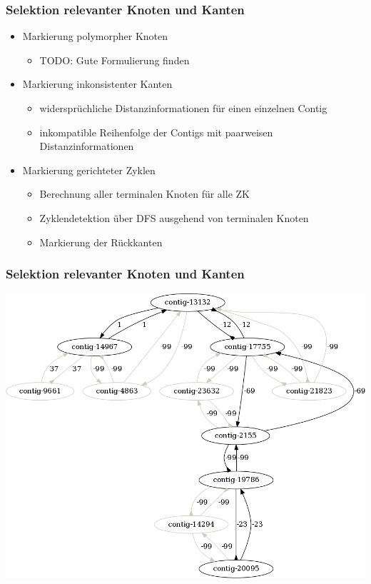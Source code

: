 \documentclass[xcolor=pst]{beamer}
\begin{document}
\begin{frame}
  \frametitle{Selektion relevanter Knoten und Kanten}
  \begin{itemize}
    \item Markierung polymorpher Knoten
    \begin{itemize}
      \item TODO: Gute Formulierung finden
    \end{itemize}
    \item Markierung inkonsistenter Kanten
    \begin{itemize}
      \item widersprüchliche Distanzinformationen für einen einzelnen Contig
      \item inkompatible Reihenfolge der Contigs mit paarweisen Distanzinformationen
    \end{itemize}
    \item Markierung gerichteter Zyklen
    \begin{itemize}
      \item Berechnung aller terminalen Knoten für alle ZK
      \item Zyklendetektion über DFS ausgehend von terminalen Knoten
      \item Markierung der Rückkanten
    \end{itemize}
  \end{itemize}
\end{frame}

\begin{frame}
  \frametitle{Selektion relevanter Knoten und Kanten}
  \begin{center}
    \includegraphics[scale=0.25]{figures/s_cerevisiae_filter_example_small.png}
  \end{center}
\end{frame}
\end{document}
